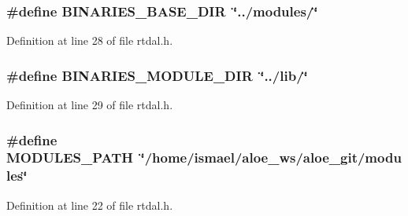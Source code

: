 \subsubsection[{B\-I\-N\-A\-R\-I\-E\-S\-\_\-\-B\-A\-S\-E\-\_\-\-D\-I\-R}]{\setlength{\rightskip}{0pt plus 5cm}\#define B\-I\-N\-A\-R\-I\-E\-S\-\_\-\-B\-A\-S\-E\-\_\-\-D\-I\-R~\char`\"{}../modules/\char`\"{}}\label{rtdal_8h_a486bd8b3b5035bc58ca728c7bd4c8e0b}


Definition at line 28 of file rtdal.\-h.

\subsubsection[{B\-I\-N\-A\-R\-I\-E\-S\-\_\-\-M\-O\-D\-U\-L\-E\-\_\-\-D\-I\-R}]{\setlength{\rightskip}{0pt plus 5cm}\#define B\-I\-N\-A\-R\-I\-E\-S\-\_\-\-M\-O\-D\-U\-L\-E\-\_\-\-D\-I\-R~\char`\"{}../lib/\char`\"{}}\label{rtdal_8h_ac3038a2b717c471b8959eb41c44b3bd5}


Definition at line 29 of file rtdal.\-h.

\subsubsection[{M\-O\-D\-U\-L\-E\-S\-\_\-\-P\-A\-T\-H}]{\setlength{\rightskip}{0pt plus 5cm}\#define M\-O\-D\-U\-L\-E\-S\-\_\-\-P\-A\-T\-H~\char`\"{}/home/ismael/aloe\-\_\-ws/aloe\-\_\-git/modules\char`\"{}}\label{rtdal_8h_a23ad38ca7b77f2e595e436a6cf11489d}


Definition at line 22 of file rtdal.\-h.

